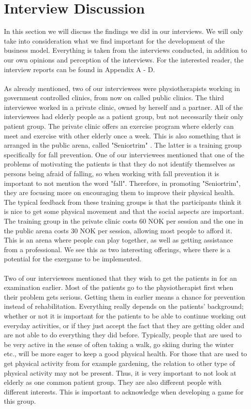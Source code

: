 \chapter{Interview Discussion}
In this section we will discuss the findings we did in our interviews. We will only take into consideration what we find important for the development of the business model. Everything is taken from the interviews conducted, in addition to our own opinions and perception of the interviews. For the interested reader, the interview reports can be found in Appendix A - D.\\ \\
As already mentioned, two of our interviewees were physiotherapists working in government controlled clinics, from now on called public clinics. The third interviewee worked in a private clinic, owned by herself and a partner. All of the interviewees had elderly people as a patient group, but not necessarily their only patient group. The private clinic offers an exercise program where elderly can meet and exercise with other elderly once a week. This is also something that is arranged in the public arena, called "Seniortrim" \cite{trim}. The latter is a training group specifically for fall prevention. One of our interviewees mentioned that one of the problems of motivating the patients is that they do not identify themselves as  persons being afraid of falling, so when working with fall prevention it is important to not mention the word "fall". Therefore, in promoting "Seniortrim", they are focusing more on encouraging them to improve their physical health. The typical feedback from these training groups is that the participants think it is nice to get some physical movement and that the social aspects are important. The training group in the private clinic costs 60 NOK per session and the one in the public arena costs 30 NOK per session, allowing most people to afford it. This is an arena where people can play together, as well as getting assistance from a professional. We see this as two interesting offerings, where there is a potential for the exergame to be implemented.  \\ \\
Two of our interviewees mentioned that they wish to get the patients in for an examination earlier. Most of the patients go to the physiotherapist first when their problem gets serious. Getting them in earlier means a chance for prevention instead of rehabilitation. Everything really depends on the patients' background; whether or not it is important for the patients to be able to continue working out everyday activities, or if they just accept the fact that they are getting older and are not able to do everything they did before. Typically, people that are used to be very active in the sense of often taking a walk, go skiing during the winter etc., will be more eager to keep a good physical health. For those that are used to get physical activity from for example gardening, the relation to other type of physical activity may not be present. Thus, it is very important to not look at elderly as one common patient group. They are also different people with different interests. This is important to acknowledge when developing a game for this group.\\ \\
